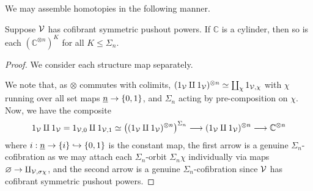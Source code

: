 \documentclass[a4paper,10pt
,draft
]{article}%
\renewcommand{\1}{\eta}%
\begin{document}


We may assemble homotopies in the following manner.

\begin{lemma}
      \label{ASSEM_HOM_LEM}
      Suppose $\mathcal V$ has cofibrant symmetric pushout powers.
      If $\mathbb C$ is a cylinder, then so is each $\left(\mathbb C^{\otimes n}\right)^{K}$ for all $K \leq \Sigma_n$.
\end{lemma}
\begin{proof}
      We consider each structure map separately.
      
      We note that, as $\otimes$ commutes with colimits,
      $(1_{\mathcal V} \amalg 1_{\mathcal V})^{\otimes n} \simeq \coprod_{\chi} 1_{\mathcal V,\chi}$
      with $\chi$ running over all set maps $\underline{n} \to \left\{0,1\right\}$,
      and $\Sigma_n$ acting by pre-composition on $\chi$.
      Now, we have the composite
      \begin{equation}
            1_{\mathcal V} \amalg 1_{\mathcal V} = 1_{\mathcal V, 0} \amalg 1_{\mathcal V, 1}
            \simeq
            \left((1_{\mathcal V} \amalg 1_{\mathcal V})^{\otimes n}\right)^{\Sigma_n}
            \longrightarrow
            (1_{\mathcal V} \amalg 1_{\mathcal V})^{\otimes n}
            \longrightarrow
            \mathbb C^{\otimes n}
      \end{equation}
      where $i: \underline{n} \to \left\{i\right\} \hookrightarrow \left\{0,1\right\}$ is the constant map,
      the first arrow is a genuine $\Sigma_n$-cofibration
      as we may attach each $\Sigma_n$-orbit $\Sigma_n \chi$ individually via maps $\varnothing \to \amalg_{\mathcal V,\sigma\chi}$,
      and the second arrow is a genuine $\Sigma_n$-cofibration since $\mathcal V$ has cofibrant symmetric pushout powers.


\end{proof}
\end{document}
